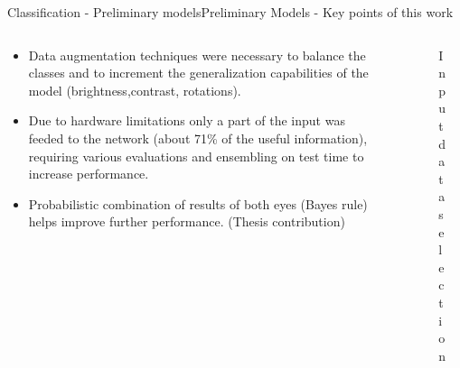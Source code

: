 \documentclass{beamer}
\begin{document}
\begin{frame}{Classification - Preliminary models}{Preliminary Models - Key points of this work}
\begin{columns}
	\begin{column}{0.7\textwidth}
		\begin{itemize}
			\item Data augmentation techniques were necessary to balance the classes and to increment the generalization capabilities of the model (brightness,contrast, rotations).
			\item Due to hardware limitations only a part of the input was feeded to the network (about 71\% of the useful information), requiring various evaluations and ensembling on test time to increase performance.
			\item Probabilistic combination of results of both eyes (Bayes rule) helps improve further performance. (Thesis contribution)
		\end{itemize}
	\end{column}
	\begin{column}{0.3\textwidth}
		\begin{figure}[p]
			\caption{Input data selection}
		\end{figure}
	\end{column}
\end{columns}
\end{frame}
\end{document}
